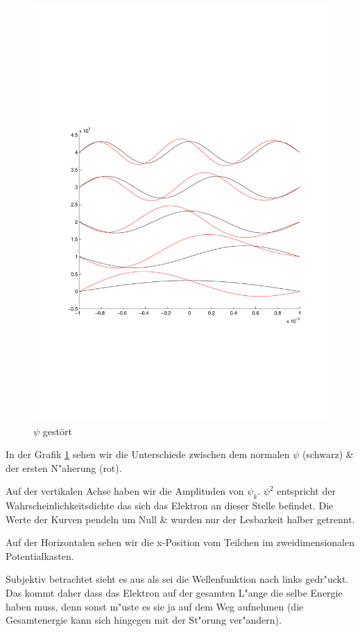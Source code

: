 \begin{refsection}
\begin{figure}
 \centering
 \includegraphics[width=12cm,clip=true,trim=2cm 7cm 1cm 8cm]{efeld/Psi_gestoert.pdf}
 \caption{$\psi$ gest\"ort}
 \label{abb:efeld_psi_gestoert}
\end{figure}

In der Grafik \ref{abb:efeld_psi_gestoert} sehen wir die Unterschiede zwischen dem normalen $\psi$ (schwarz) 
\& der ersten N"aherung (rot).


Auf der vertikalen Achse haben wir die Amplituden von $\psi_k$.
$\psi^2$ entspricht der Wahrscheinlichkeitsdichte das sich das Elektron an dieser Stelle befindet.
Die Werte der Kurven pendeln um Null \& wurden nur der Lesbarkeit halber getrennt.

Auf der Horizontalen sehen wir die x-Position vom Teilchen im zweidimensionalen Potentialkasten.

Subjektiv betrachtet sieht es aus als sei die Wellenfunktion nach links gedr"uckt.
Das kommt daher dass das Elektron auf der gesamten L"ange die selbe Energie haben muss,
denn sonst m"uste es sie ja auf dem Weg aufnehmen (die Gesamtenergie kann sich hingegen mit der St"orung ver"andern).


\end{refsection}

